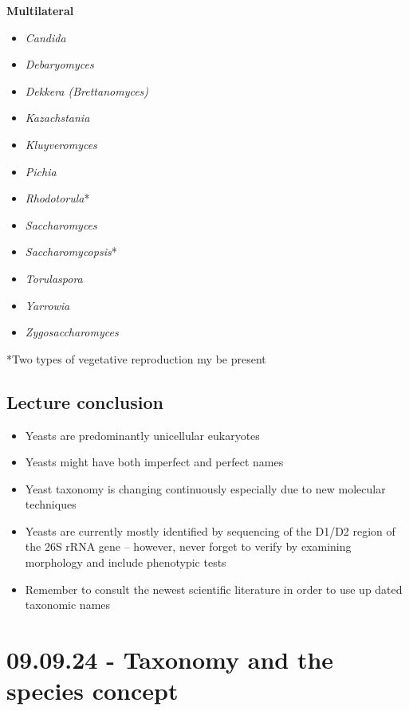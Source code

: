 \begin{highlight}
\begin{multicols}{2}
        \textbf{Multilateral}
        \begin{itemize}
            \item \textit{Candida}
            \item \textit{Debaryomyces}
            \item \textit{Dekkera (Brettanomyces)}
            \item \textit{Kazachstania}
            \item \textit{Kluyveromyces}
            \item \textit{Pichia}
            \item \textit{Rhodotorula}*
            \item \textit{Saccharomyces}
            \item \textit{Saccharomycopsis}*
            \item \textit{Torulaspora}
            \item \textit{Yarrowia}
            \item \textit{Zygosaccharomyces}
        \end{itemize}
    \end{multicols}
\end{highlight}
*Two types of vegetative reproduction my be present

\subsection{Lecture conclusion}
\begin{highlight}
    \begin{itemize}
        \item Yeasts are predominantly unicellular eukaryotes
        \item Yeasts might have both imperfect and perfect names
        \item Yeast taxonomy is changing continuously especially due to new molecular 
        techniques 
        \item Yeasts are currently mostly identified by sequencing of the D1/D2 region of 
        the 26S rRNA gene – however, never forget to verify by examining 
        morphology and include phenotypic tests
        \item Remember to consult the newest scientific literature in order to use up
        dated taxonomic names
    \end{itemize}
\end{highlight}

\section{09.09.24 - Taxonomy and the species concept}

